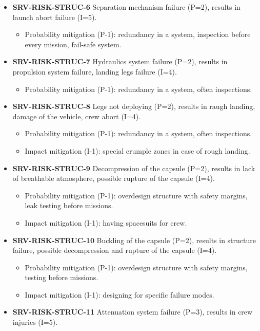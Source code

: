 \begin{itemize}
	 \item \textbf{SRV-RISK-STRUC-6} Separation mechanism failure (P=2), results in launch abort failure (I=5).
	\begin{itemize}
		 \item Probability mitigation (P-1): redundancy in a system, inspection before every mission, fail-safe system.	\end{itemize}
	 \item \textbf{SRV-RISK-STRUC-7} Hydraulics system failure (P=2), results in propulsion system failure, landing legs failure (I=4).
	\begin{itemize}
		 \item Probability mitigation (P-1): redundancy in a system, often inspections.	\end{itemize}
	 \item \textbf{SRV-RISK-STRUC-8} Legs not deploying (P=2), results in raugh landing, damage of the vehicle, crew abort (I=4).
	\begin{itemize}
		 \item Probability mitigation (P-1): redundancy in a system, often inspections.		 \item Impact mitigation (I-1): special crumple zones in case of rough landing.	\end{itemize}
	 \item \textbf{SRV-RISK-STRUC-9} Decompression of the capsule (P=2), results in lack of breathable atmosphere, possible rupture of the capsule (I=4).
	\begin{itemize}
		 \item Probability mitigation (P-1): overdesign structure with safety margins, leak testing before missions.		 \item Impact mitigation (I-1): having spacesuits for crew.	\end{itemize}
	 \item \textbf{SRV-RISK-STRUC-10} Buckling of the capsule (P=2), results in structure failure, possible decompression and rupture of the capsule (I=4).
	\begin{itemize}
		 \item Probability mitigation (P-1): overdesign structure with safety margins, testing before missions.		 \item Impact mitigation (I-1): designing for specific failure modes.	\end{itemize}
	 \item \textbf{SRV-RISK-STRUC-11} Attenuation system failure (P=3), results in crew injuries (I=5).
	\begin{itemize}

\end{itemize}
\end{itemize}
